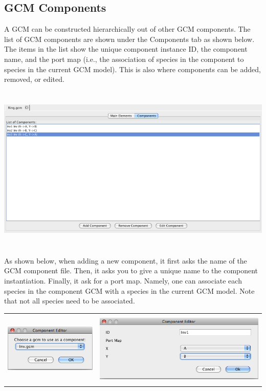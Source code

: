 \documentclass[titlepage,11pt]{article}
\begin{document}
\clearpage

\subsection{\label{GCMComp}GCM Components}

A GCM can be constructed hierarchically out of other GCM components.
The list of GCM components are shown under the Components tab as shown
below.  The items in the list show the unique component instance ID, the
component name, and the port map (i.e., the association of species in
the component to species in the current GCM model).  This is also
where components can be added, removed, or edited.   

\begin{center}
\includegraphics[height=80mm]{screenshots/GCMComp}
\end{center}

As shown below, when adding a new component, it first asks the name of the
GCM component file.  Then, it asks you to give a unique name to the
component instantiation.  Finally, it ask for a port map.  Namely,
one can associate each species in the component GCM with a species in
the current GCM model.  Note that not all species need to be
associated.  

\begin{center}
\begin{tabular}{cc}
\includegraphics[height=25mm]{screenshots/AddComp} &
\includegraphics[height=35mm]{screenshots/AddComp2}
\end{tabular}
\end{center}
\end{document}
